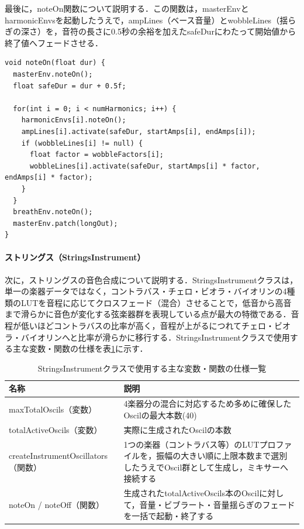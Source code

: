最後に，noteOn関数について説明する．この関数は，masterEnvとharmonicEnvsを起動したうえで，ampLines（ベース音量）とwobbleLines（揺らぎの深さ）を，音符の長さに0.5秒の余裕を加えたsafeDurにわたって開始値から終了値へフェードさせる．

\begin{lstlisting}[caption={FluteInstrument::noteOn関数}, label={lst:gakki_flute_noteon}]
void noteOn(float dur) {
  masterEnv.noteOn();
  float safeDur = dur + 0.5f;

  for(int i = 0; i < numHarmonics; i++) {
    harmonicEnvs[i].noteOn();
    ampLines[i].activate(safeDur, startAmps[i], endAmps[i]);
    if (wobbleLines[i] != null) {
      float factor = wobbleFactors[i];
      wobbleLines[i].activate(safeDur, startAmps[i] * factor, endAmps[i] * factor);
    }
  }
  breathEnv.noteOn();
  masterEnv.patch(longOut);
}
\end{lstlisting}

\paragraph{ストリングス（StringsInstrument）}
次に，ストリングスの音色合成について説明する．StringsInstrumentクラスは，単一の楽器データではなく，コントラバス・チェロ・ビオラ・バイオリンの4種類のLUTを音程に応じてクロスフェード（混合）させることで，低音から高音まで滑らかに音色が変化する弦楽器群を表現している点が最大の特徴である．音程が低いほどコントラバスの比率が高く，音程が上がるにつれてチェロ・ビオラ・バイオリンへと比率が滑らかに移行する．StringsInstrumentクラスで使用する主な変数・関数の仕様を表\ref{table:gakki_strings}に示す．

\begin{table}[H]
    \caption{StringsInstrumentクラスで使用する主な変数・関数の仕様一覧}
    \centering
    \label{table:gakki_strings}
    \begin{tabular}{p{4.3cm}p{9.7cm}}
    \hline
    \textbf{名称} & \textbf{説明}\\
    \hline
    maxTotalOscils（変数） & 4楽器分の混合に対応するため多めに確保したOscilの最大本数(40)\\
    \hline
    totalActiveOscils（変数） & 実際に生成されたOscilの本数\\
    \hline
    createInstrumentOscillators（関数） & 1つの楽器（コントラバス等）のLUTプロファイルを，振幅の大きい順に上限本数まで選別したうえでOscil群として生成し，ミキサーへ接続する\\
    \hline
    noteOn / noteOff（関数） & 生成されたtotalActiveOscils本のOscilに対して，音量・ビブラート・音量揺らぎのフェードを一括で起動・終了する\\
    \hline
    \end{tabular}
\end{table}

